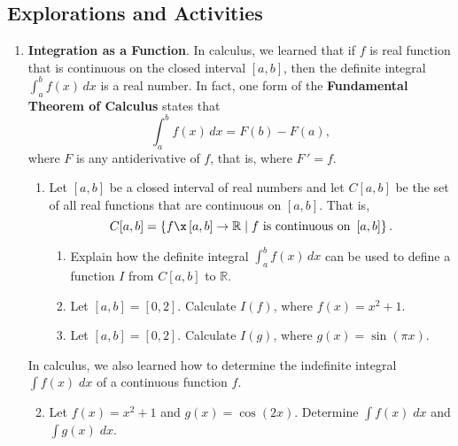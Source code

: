 
%
\subsection*{Explorations and Activities}
\setcounter{oldenumi}{\theenumi}
\begin{enumerate} \setcounter{enumi}{\theoldenumi}
 \item \textbf{Integration as a Function}.  In calculus, we learned that if  $f$  is real function that is continuous on the closed interval  $\left[ {a, b} \right]$, then the definite integral  $\int_a^b {f( x ) \, dx} $ is a real number.  In fact, one form of the \textbf{Fundamental Theorem of Calculus}
%
 states that
\[
\int_a^b {f( x ) \, dx} = F( b ) - F( a ),
\]
where  $F$  is any antiderivative of  $f$, that is, where  $F \,' = f$\!.
%
\begin{enumerate}
\item Let  $\left[ {a, b} \right]$ be a closed interval of real numbers and let  
$C {\left[ {a, b} \right]} $ be the set of all real functions that are continuous on  
$\left[ {a, b} \right]$.  That is,
\[
C{\left[ {a, b} \right]}  = \left\{ {f\x \left[ {a, b} \right] \to \mathbb{R}  \mid f\text{ is continuous on }\left[ {a, b} \right]} \right\}.
\]
%
\begin{enumerate}
\item Explain how the definite integral   $\int_a^b {f( x ) \, dx} $  can be used to define a function  $I$  from  $C{\left[ {a, b} \right]} $ to  $\mathbb{R}$.

\item Let  $\left[ {a, b} \right] = \left[ {0, 2} \right]$.  Calculate  $I( f )$,
  where  $f( x ) = x^2  + 1$.

\item Let  $\left[ {a, b} \right] = \left[ {0, 2} \right]$.  Calculate  $I( g )$,
  where  $g( x ) = \sin ( {\pi x} )$.
\end{enumerate}
%
\end{enumerate}
%
In calculus, we also learned how to determine the indefinite integral  
$\int {f( x )} \;dx$ of a continuous function  $f$.

\begin{enumerate}
\setcounter{enumii}{1}
\item Let  $f( x ) = x^2  + 1$ and $g(x) = \cos( 2x )$. Determine  
$\int {f( x )} \;dx$ and $\int {g( x )} \;dx$.


\end{enumerate}
\end{enumerate}
